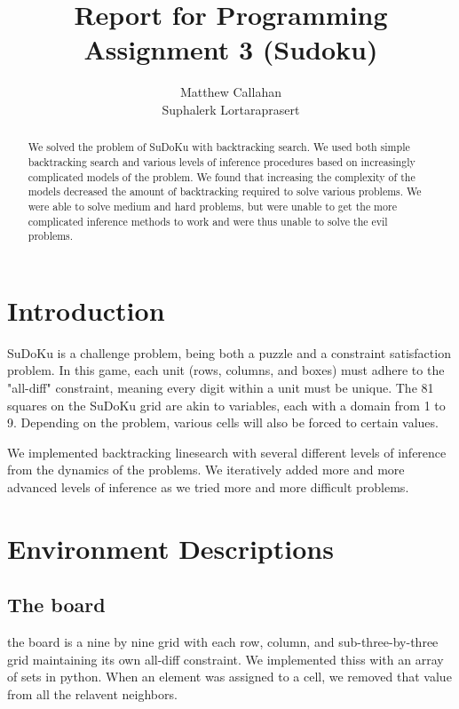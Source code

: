\documentclass{article}
\title{Report for Programming Assignment 3 (Sudoku)}
\author{%
  Matthew Callahan\\
  \And
  Suphalerk Lortaraprasert
}
\begin{document}
\maketitle


\begin{abstract}
  We solved the problem of SuDoKu with backtracking search. We used both simple backtracking search and various levels of inference procedures based on increasingly complicated models of the problem. We found that increasing the complexity of the models decreased the amount of backtracking required to solve various problems. We were able to solve medium and hard problems, but were unable to get the more complicated inference methods to work and were thus unable to solve the evil problems. 
 \end{abstract}

\section{Introduction}
SuDoKu is a challenge problem, being both a puzzle and a constraint satisfaction problem. In this game, each unit (rows, columns, and boxes) must adhere to the "all-diff" constraint, meaning every digit within a unit must be unique. The 81 squares on the SuDoKu grid are akin to variables, each with a domain from 1 to 9. Depending on the problem, various cells will also be forced to certain values. 

We implemented backtracking linesearch with several different levels of inference from the dynamics of the problems.  We iteratively added more and more advanced levels of inference as we tried more and more difficult problems. 

  
\section{Environment Descriptions}
\subsection{The board}
the board is a nine by nine grid with each row, column, and sub-three-by-three grid maintaining its own all-diff constraint. We implemented thiss with an array of sets in python. When an element was assigned to a cell, we removed that value from all the relavent neighbors. 
\end{document}
